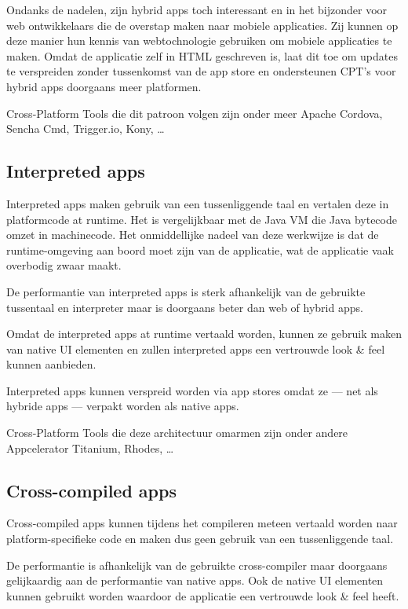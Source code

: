 \documentclass[a4paper]{IEEEconf}
\begin{document}
Ondanks de nadelen, zijn hybrid apps toch interessant en in het bijzonder voor web ontwikkelaars die de overstap maken naar mobiele applicaties. Zij kunnen op deze manier hun kennis van webtochnologie gebruiken om mobiele applicaties te maken. Omdat de applicatie zelf in HTML geschreven is, laat dit toe om updates te verspreiden zonder tussenkomst van de app store en ondersteunen CPT's voor hybrid apps doorgaans meer platformen.

Cross-Platform Tools die dit patroon volgen zijn onder meer Apache Cordova, Sencha Cmd, Trigger.io, Kony, \ldots

\subsection{Interpreted apps}

Interpreted apps maken gebruik van een tussenliggende taal en vertalen deze in platformcode at runtime. Het is vergelijkbaar met de Java VM die Java bytecode omzet in machinecode. Het onmiddellijke nadeel van deze werkwijze is dat de runtime-omgeving aan boord moet zijn van de applicatie, wat de applicatie vaak overbodig zwaar maakt.

De performantie van interpreted apps is sterk afhankelijk van de gebruikte tussentaal en interpreter maar is doorgaans beter dan web of hybrid apps.

Omdat de interpreted apps at runtime vertaald worden, kunnen ze gebruik maken van native UI elementen en zullen interpreted apps een vertrouwde look \& feel kunnen aanbieden. 

Interpreted apps kunnen verspreid worden via app stores omdat ze --- net als hybride apps --- verpakt worden als native apps. 
 
Cross-Platform Tools die deze architectuur omarmen zijn onder andere Appcelerator Titanium, Rhodes, \ldots

\subsection{Cross-compiled apps}

Cross-compiled apps kunnen tijdens het compileren meteen vertaald worden naar platform-specifieke code en maken dus geen gebruik van een tussenliggende taal. 

De performantie is afhankelijk van de gebruikte cross-compiler maar doorgaans gelijkaardig aan de performantie van native apps. Ook de native UI elementen kunnen gebruikt worden waardoor de applicatie een vertrouwde look \& feel heeft.
\end{document}

